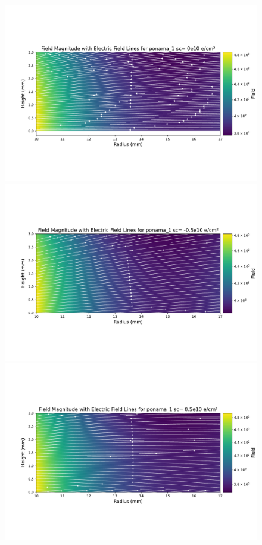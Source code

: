 \begin{figure} %
\centering
\includegraphics[trim={1cm 3.5cm 0.5cm 4.0cm},clip,width=0.99\linewidth]{ch3/figs/elect_field_lines_surface_ponama_1_sc_0.pdf}
\includegraphics[trim={1cm 3.5cm 0.5cm 4.0cm},clip,width=0.99\linewidth]{ch3/figs/elect_field_lines_surface_ponama_1_sc_-0.5.pdf}
\includegraphics[trim={1cm 3.5cm 0.5cm 4.0cm},clip,width=0.99\linewidth]{ch3/figs/elect_field_lines_surface_ponama_1_sc_0.5.pdf}

\end{figure}
